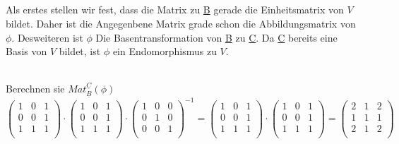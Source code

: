 \documentclass{article}
\begin{document}
  \subsection{}
  Als erstes stellen wir fest, dass die Matrix zu \underline{B} gerade die Einheitsmatrix von $V$ bildet. Daher ist die Angegenbene Matrix grade schon die Abbildungsmatrix von $\phi$. Desweiteren ist $\phi$ Die Basentransformation von \underline{B} zu \underline{C}. Da \underline{C} bereits eine Basis von $V$ bildet, ist $\phi$ ein Endomorphismus zu $V$.

  \\
  Berechnen sie $Mat_{\underline{B}}^{\underline{C} }(\phi)$ \\
  \begin{math}
    \begin{pmatrix}
      1 & 0 & 1 \\
      0 & 0 & 1 \\
      1 & 1 & 1 \\
    \end{pmatrix}
    \cdot
    \begin{pmatrix}

      1 & 0 & 1 \\
      0 & 0 & 1 \\
      1 & 1 & 1 \\
    \end{pmatrix}
    \cdot
    \begin{pmatrix}
      1 & 0 & 0 \\
      0 & 1 & 0 \\
      0 & 0 & 1 \\
    \end{pmatrix}^{-1}
    =
    \begin{pmatrix}
      1 & 0 & 1 \\
      0 & 0 & 1 \\
      1 & 1 & 1 \\
    \end{pmatrix}
    \cdot
    \begin{pmatrix}

      1 & 0 & 1 \\
      0 & 0 & 1 \\
      1 & 1 & 1 \\
    \end{pmatrix}
    =
    \begin{pmatrix}
      2 & 1 & 2 \\
      1 & 1 & 1 \\
      2 & 1 & 2 \\
      \end{pmatrix}
    \end{math}
\end{document}
